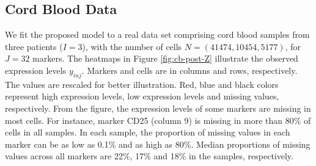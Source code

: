 \documentclass[12pt,]{article}
\begin{document}
\subsection{Cord Blood Data}\label{sec:CB-real}
We fit the proposed model to a real data set comprising cord blood samples from
three patients ($I=3$), with the number of cells $N=(41474, 10454, 5177)$, for
$J=32$ markers. The heatmaps in Figure \ref{fig:cb-post-Z} illustrate the
observed expression levels $y_{inj}$.  Markers and cells are in columns and
rows, respectively. The values are rescaled for better illustration.  Red, blue
and black colors represent high expression levels, low expression levels and
missing values, respectively.  From the figure, the expression levels of some
markers are missing in most cells. For instance, marker CD25 (column 9) is
missing in more than 80\% of cells in all samples.
In each sample, the proportion of missing values in each marker can be as low
as 0.1\% and as high as 80\%.  Median proportions of missing values across all
markers are 22\%, 17\% and 18\% in the samples, respectively.
\end{document}
